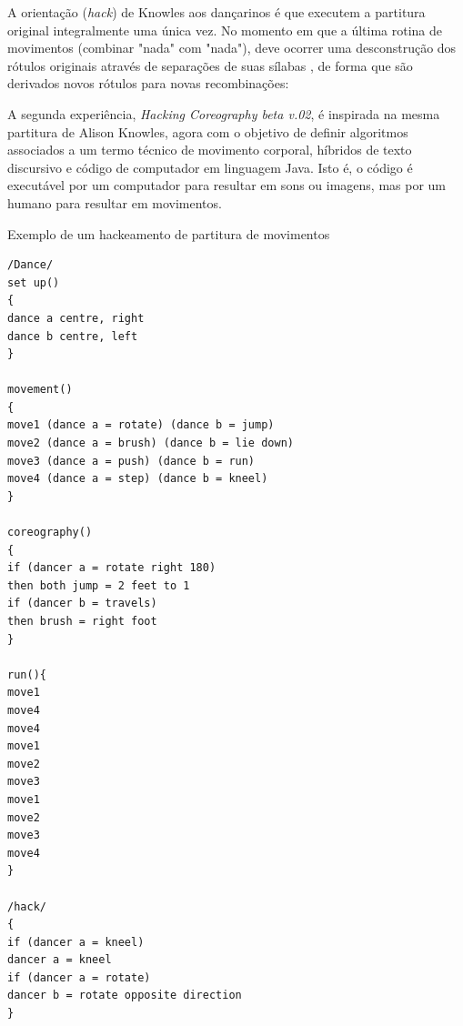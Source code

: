 A orientação (\emph{hack}) de Knowles aos dançarinos é que executem a partitura original integralmente uma única vez. No momento em que a última rotina de movimentos (combinar "nada" com "nada"), deve ocorrer uma desconstrução dos rótulos originais através de separações de suas sílabas , de forma que são derivados novos rótulos para novas recombinações:

\begin{citacao}
\end{citacao}

A segunda experiência, \emph{Hacking Coreography beta v.02}, é inspirada na mesma partitura de Alison Knowles, agora com o objetivo de definir algoritmos associados a um termo técnico de movimento corporal, híbridos de texto discursivo e código de computador em linguagem Java. Isto é, o código é executável por um computador para resultar em sons ou imagens, mas por um humano para resultar em movimentos.

\begin{example}{Exemplo de um hackeamento de partitura de movimentos}
\begin{verbatim}
/Dance/
set up()
{
dance a centre, right
dance b centre, left
}

movement()
{
move1 (dance a = rotate) (dance b = jump)
move2 (dance a = brush) (dance b = lie down)
move3 (dance a = push) (dance b = run)
move4 (dance a = step) (dance b = kneel)
}

coreography()
{
if (dancer a = rotate right 180)
then both jump = 2 feet to 1
if (dancer b = travels)
then brush = right foot
}

run(){
move1
move4
move4
move1
move2
move3
move1
move2
move3
move4
}

/hack/
{
if (dancer a = kneel)
dancer a = kneel
if (dancer a = rotate)
dancer b = rotate opposite direction 
}
\end{verbatim}
\end{example}

